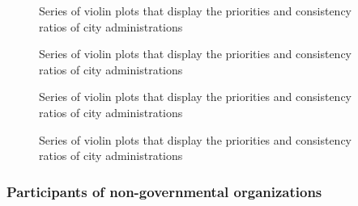 \documentclass [oneside,10pt,a4paper,ngerman,BCOR10mm,headsepline,parindent,final]{scrartcl}
\begin{document}
    \begin{figure}
        \begin{center}\end{center}
        \caption{Series of violin plots that display the priorities and consistency ratios of city administrations}
        \label{fig:violins_CA_attributes}
    \end{figure}
    
    \begin{figure}
        \begin{center}\end{center}
        \caption{Series of violin plots that display the priorities and consistency ratios of city administrations}
        \label{fig:violins_CA_attributes}
    \end{figure}
    
    \begin{figure}
        \begin{center}\end{center}
        \caption{Series of violin plots that display the priorities and consistency ratios of city administrations}
        \label{fig:violins_CA_attributes}
    \end{figure}
    
    \begin{figure}
        \begin{center}\end{center}
        \caption{Series of violin plots that display the priorities and consistency ratios of city administrations}
        \label{fig:violins_CA_attributes}
    \end{figure}
    
    \hypertarget{participants-of-non-governmental-organizations}{%
\subsubsection{Participants of non-governmental
organizations}\label{participants-of-non-governmental-organizations}}
\end{document}
